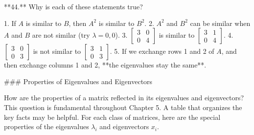 

**44.** Why is each of these statements true?

1. If \(A\) is similar to \(B\), then \(A^{2}\) is similar to \(B^{2}\).
2. \(A^{2}\) and \(B^{2}\) can be similar when \(A\) and \(B\) are not similar (try \(\lambda=0,0\)).
3. \(\left[\begin{smallmatrix}3&0\\ 0&4\end{smallmatrix}\right]\) is similar to \(\left[\begin{smallmatrix}3&1\\ 0&4\end{smallmatrix}\right]\).
4. \(\left[\begin{smallmatrix}3&0\\ 0&3\end{smallmatrix}\right]\) is not similar to \(\left[\begin{smallmatrix}3&1\\ 0&3\end{smallmatrix}\right]\).
5. If we exchange rows 1 and 2 of \(A\), and then exchange columns 1 and 2, **the eigenvalues stay the same**.

### Properties of Eigenvalues and Eigenvectors

How are the properties of a matrix reflected in its eigenvalues and eigenvectors? This question is fundamental throughout Chapter 5. A table that organizes the key facts may be helpful. For each class of matrices, here are the special properties of the eigenvalues \(\lambda_{i}\) and eigenvectors \(x_{i}\).

